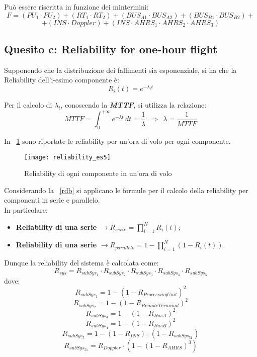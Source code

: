 Può essere riscritta in funzione dei mintermini:
$$ F = (PU_1 \cdot PU_2) + (RT_1 \cdot RT_2) + (BUS_{A1} \cdot BUS_{A2}) + (BUS_{B1} \cdot BUS_{B2})+$$
$$+ (INS \cdot Doppler) + (INS \cdot AHRS_1 \cdot AHRS_2 \cdot AHRS_3)$$

\clearpage

\subsection{Quesito c: Reliability for one-hour flight}

Supponendo che la distribuzione dei fallimenti sia esponenziale, si ha che la
Reliability dell'i-esimo componente è:
$$R_i(t) = e^{-\lambda_i t}$$

Per il calcolo di $\lambda_i$, conoscendo la \textbf{\textit{MTTF}}, si utilizza
la relazione:
$$ MTTF = \int_{0}^{+\infty} e^{-\lambda t}\, dt = \frac{1}{\lambda} \ \ \Longrightarrow \ \ \lambda = \frac{1}{MTTF} $$

In \figurename~\ref{reliability_es5} sono riportate le reliability per un'ora di
volo per ogni componente.\\

\begin{figure}[!htbp]
  \centering
  \texttt{[image: reliability\_es5]}
  \caption{Reliability di ogni componente in un'ora di volo}
  \label{reliability_es5}
\end{figure}

Considerando la \figurename~\ref{rdb} si applicano le formule per il calcolo
della reliability per componenti in serie e parallelo.\\
In particolare:
\begin{itemize}
  \item \textbf{Reliability di una serie} $\rightarrow R_{serie} = \prod_{i=1}^{N}{R_i(t)}$;
  \item \textbf{Reliability di una serie} $\rightarrow R_{parallelo} = 1 - \prod_{i=1}^{N}{(1- R_i(t))}$.
\end{itemize}

Dunque la reliability del sistema è calcolata come:
$$ R_{sys} = R_{subSys_1} \cdot R_{subSys_2} \cdot R_{subSys_3} \cdot R_{subSys_4} \cdot R_{subSys_5}$$
dove:
$$R_{subSys_1} = 1 - (1 - R_{ProcessingUnit})^2$$
$$R_{subSys_2} = 1 - (1 - R_{RemoteTerminal})^2$$
$$R_{subSys_3} = 1 - (1 - R_{BusA})^2$$
$$R_{subSys_4} = 1 - (1 - R_{BusB})^2$$
$$R_{subSys_5} = 1 - (1 - R_{INS}) \cdot (1 - R_{subSys_{51}})$$
$$R_{subSys_{51}} = R_{Doppler} \cdot (1 - (1 - R_{AHRS})^3)$$

